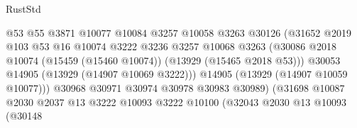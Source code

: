 \begin{lexlean}{RustStd}
\begin{coremodule}
                                            @53
                                            @55
                                            @3871
                                            @10077
                                            @10084
                                            @3257
                                            @10058
                                            @3263
                                            @30126
                                            (@31652
                                              @2019
                                              @103
                                              @53
                                              @16
                                              @10074
                                              @3222
                                              @3236
                                              @3257
                                              @10068
                                              @3263
                                              (@30086
                                                @2018
                                                @10074
                                                (@15459 (@15460 @10074))
                                                (@13929 (@15465 @2018 @53)))
                                              @30053
                                              @14905
                                              (@13929 (@14907 @10069 @3222)))
                                            @14905
                                            (@13929 (@14907 @10059 @10077)))
                                          @30968
                                          @30971
                                          @30974
                                          @30978
                                          @30983
                                          @30989)
                                        (@31698
                                          @10087
                                          @2030
                                          @2037
                                          @13
                                          @3222
                                          @10093
                                          @3222
                                          @10100
                                          (@32043
                                            @2030
                                            @13
                                            @10093
                                            (@30148

\end{coremodule}
\end{lexlean}

